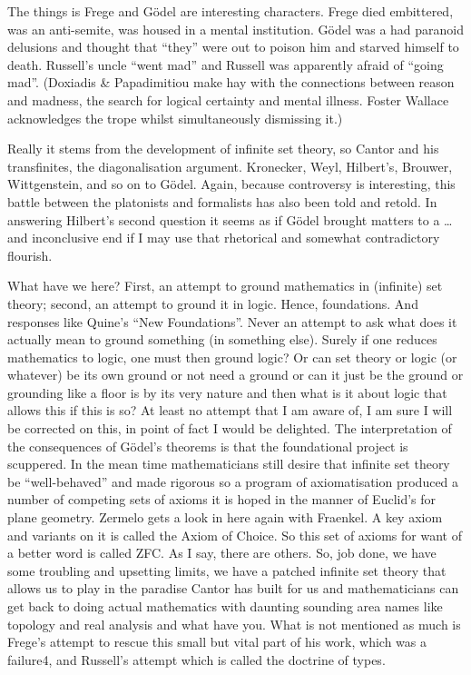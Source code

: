 \documentclass[dah,phd,a4paper]{xe_uccthesis}
\begin{document}
The things is Frege and Gödel are interesting characters. Frege died embittered, was an anti-semite, was housed in a mental institution. Gödel was a had paranoid delusions and thought that “they” were out to poison him and starved himself to death. Russell's uncle “went mad” and Russell was apparently afraid of “going mad”. (Doxiadis \& Papadimitiou make hay with the connections between reason and madness, the search for logical certainty and mental illness. Foster Wallace acknowledges the trope whilst simultaneously dismissing it.)

Really it stems from the development of infinite set theory, so Cantor and his transfinites, the diagonalisation argument. Kronecker, Weyl, Hilbert's, Brouwer, Wittgenstein, and so on to Gödel. Again, because controversy is interesting, this battle between the platonists and formalists has also been told and retold.
In answering Hilbert's second question it seems as if Gödel brought matters to a … and inconclusive end if I may use that rhetorical and somewhat contradictory flourish.

What have we here? First, an attempt to ground mathematics in (infinite) set theory; second, an attempt to ground it in logic. Hence, foundations. And responses like Quine's “New Foundations”. Never an attempt to ask what does it actually mean to ground something (in something else). Surely if one reduces mathematics to logic, one must then ground logic? Or can set theory or logic (or whatever) be its own ground or not need a ground or can it just be the ground or grounding like a floor is by its very nature and then what is it about logic that allows this if this is so? At least no attempt that I am aware of, I am sure I will be corrected on this, in point of fact I would be delighted.
The interpretation of the consequences of Gödel's theorems is that the foundational project is scuppered.
In the mean time mathematicians still desire that infinite set theory be “well-behaved” and made rigorous so a program of axiomatisation produced a number of competing sets of axioms it is hoped in the manner of Euclid's for plane geometry. Zermelo gets a look in here again with Fraenkel. A key axiom and variants on it is called the Axiom of Choice. So this set of axioms for want of a better word is called ZFC. As I say, there are others.
So, job done, we have some troubling and upsetting limits, we have a patched infinite set theory that allows us to play in the paradise Cantor has built\citep{cantor_uber_1874} for us and mathematicians can get back to doing actual mathematics with daunting sounding area names like topology and real analysis and what have you.
What is not mentioned as much is Frege's attempt to rescue this small but vital part of his work, which was a failure4, and Russell's attempt which is called the doctrine of types\citep{russell_appendix_1903}.
\end{document}
